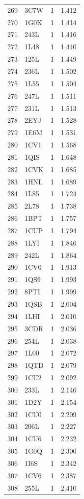 \begin{longtable}{r l r r}
269 & 3C7W & 1 & 1.412 \\
270 & 1G0K & 1 & 1.414 \\
271 & 243L & 1 & 1.416 \\
272 & 1L48 & 1 & 1.440 \\
273 & 125L & 1 & 1.449 \\
274 & 236L & 1 & 1.502 \\
275 & 1L55 & 1 & 1.504 \\
276 & 247L & 1 & 1.511 \\
277 & 231L & 1 & 1.513 \\
278 & 2EYJ & 1 & 1.528 \\
279 & 1E6M & 1 & 1.531 \\
280 & 1CV1 & 1 & 1.568 \\
281 & 1QIS & 1 & 1.648 \\
282 & 1CVK & 1 & 1.685 \\
283 & 1HNL & 1 & 1.689 \\
284 & 1L85 & 1 & 1.724 \\
285 & 2L78 & 1 & 1.738 \\
286 & 1BPT & 1 & 1.757 \\
287 & 1CUP & 1 & 1.794 \\
288 & 1LYI & 1 & 1.846 \\
289 & 242L & 1 & 1.864 \\
290 & 1CV0 & 1 & 1.913 \\
291 & 1QS9 & 1 & 1.993 \\
292 & 8PTI & 1 & 1.999 \\
293 & 1QSB & 1 & 2.004 \\
294 & 1LHI & 1 & 2.010 \\
295 & 3CDR & 1 & 2.036 \\
296 & 254L & 1 & 2.038 \\
297 & 1L00 & 1 & 2.072 \\
298 & 1QTD & 1 & 2.079 \\
299 & 1CU2 & 1 & 2.092 \\
300 & 233L & 1 & 2.146 \\
301 & 1D2Y & 1 & 2.154 \\
302 & 1CU0 & 1 & 2.209 \\
303 & 206L & 1 & 2.227 \\
304 & 1CU6 & 1 & 2.232 \\
305 & 1G0Q & 1 & 2.300 \\
306 & 1I6S & 1 & 2.342 \\
307 & 1CV6 & 1 & 2.387 \\
308 & 255L & 1 & 2.410 \\

\end{longtable}
